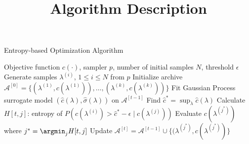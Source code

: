\documentclass[a4paper,10pt]{article}
\title{Algorithm Description}
\author{}
\date{}
\begin{document}
\maketitle

\begin{algorithm}
    \caption{Entropy-based Optimization Algorithm}
    \begin{algorithmic}[1]
    \Require Objective function $c(\cdot)$, sampler $p$, number of initial samples $N$, threshold $\epsilon$
    \State Generate samples $\lambda^{(i)}$, $1 \leq i \leq N$ from $p$
    \State Initialize archive $\mathcal{A}^{[0]} = \{(\lambda^{(1)}, c(\lambda^{(1)})), \ldots, (\lambda^{(k)}, c(\lambda^{(k)}))\}$
        \State Fit Gaussian Process surrogate model $(\hat{c}(\lambda), \hat{\sigma}(\lambda))$ on $\mathcal{A}^{[t-1]}$
        \State Find $\hat{c}^* = \sup_{\lambda} \hat{c}(\lambda)$
            \State Calculate $H[t,j]$: entropy of $P(c(\lambda^{(i)}) > \hat{c}^* - \epsilon \mid c(\lambda^{(j)}))$
        \EndFor
        \State Evaluate $c(\lambda^{(j^*)})$ where $j^* = \argmin_j H[t,j]$
        \State Update $\mathcal{A}^{[t]} = \mathcal{A}^{[t-1]} \cup \{(\lambda^{(j^*)}, c(\lambda^{(j^*)})\}$
    \EndFor
    \end{algorithmic}
    \end{algorithm}
\end{document}
